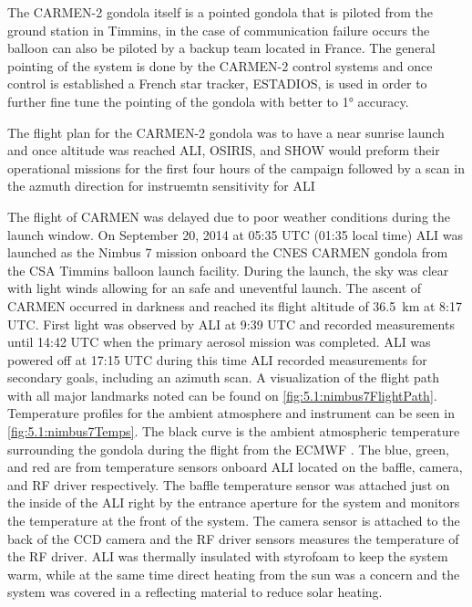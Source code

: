 The CARMEN-2 gondola itself is a pointed gondola that is piloted from the ground station in Timmins, in the case of communication failure occurs the balloon can also be piloted by a backup team located in France. The general pointing of the system is done by the CARMEN-2 control systems and once control is established a French star tracker, ESTADIOS, is used in order to further fine tune the pointing of the gondola with better to 1\si{\degree} accuracy.

The flight plan for the CARMEN-2 gondola was to have a near sunrise launch and once altitude was reached ALI, OSIRIS, and SHOW would preform their operational missions for the first four hours of the campaign followed by a scan in the azmuth direction for instruemtn sensitivity for ALI



The flight of CARMEN was delayed due to poor weather conditions during the launch window. On September 20, 2014 at 05:35 UTC (01:35 local time) ALI was launched as the Nimbus 7 mission onboard the CNES CARMEN gondola from the CSA Timmins balloon launch facility. During the launch, the sky was clear with light winds allowing for an safe and uneventful launch. The ascent of CARMEN occurred in darkness and reached its flight altitude of 36.5~km at 8:17 UTC. First light was observed by ALI at 9:39 UTC and recorded measurements until 14:42 UTC when the primary aerosol mission was completed. ALI was powered off at 17:15 UTC during this time ALI recorded measurements for secondary goals, including an azimuth scan. A visualization of the flight path with all major landmarks noted can be found on \autoref{fig:5.1:nimbus7FlightPath}. Temperature profiles for the ambient atmosphere and instrument can be seen in \autoref{fig:5.1:nimbus7Temps}. The black curve is the ambient atmospheric temperature surrounding the gondola during the flight from the ECMWF \citep{Molteni1996}. The blue, green, and red are from temperature sensors onboard ALI located on the baffle, camera, and RF driver respectively. The baffle temperature sensor was attached just on the inside of the ALI right by the entrance aperture for the system and monitors the temperature at the front of the system. The camera sensor is attached to the back of the CCD camera and the RF driver sensors measures the temperature of the RF driver. ALI was thermally insulated with styrofoam to keep the system warm, while at the same time direct heating from the sun was a concern and the system was covered in a reflecting material to reduce solar heating.

